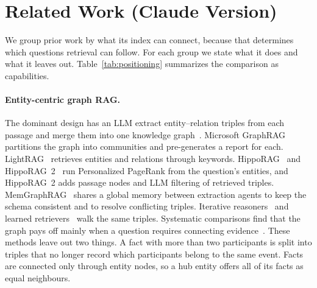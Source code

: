 \documentclass[sigconf, review, anonymous]{acmart}
\begin{document}
\section{Related Work (Claude Version)}
\label{sec:related_claude}

We group prior work by what its index can connect, because that determines which questions retrieval can follow. For each group we state what it does and what it leaves out. Table~\ref{tab:positioning} summarizes the comparison as capabilities.

\paragraph{Entity-centric graph RAG.}
The dominant design has an LLM extract entity--relation triples from each passage and merge them into one knowledge graph~\cite{bian2025llm,zhang2024extract,mo2025kggen,lairgi2024itext2kg}. Microsoft GraphRAG~\cite{edge2024local} partitions the graph into communities and pre-generates a report for each. LightRAG~\cite{guo2024lightrag} retrieves entities and relations through keywords. HippoRAG~\cite{gutierrez2024hipporag} and HippoRAG~2~\cite{gutierrez2025rag} run Personalized PageRank from the question's entities, and HippoRAG~2 adds passage nodes and LLM filtering of retrieved triples. MemGraphRAG~\cite{wu2026memgraphrag} shares a global memory between extraction agents to keep the schema consistent and to resolve conflicting triples. Iterative reasoners~\cite{sun2023think,ma2024think,luo2023reasoning} and learned retrievers~\cite{mavromatis2024gnn} walk the same triples. Systematic comparisons find that the graph pays off mainly when a question requires connecting evidence~\cite{zhou2025indepth,xiang2025when}. These methods leave out two things. A fact with more than two participants is split into triples that no longer record which participants belong to the same event. Facts are connected only through entity nodes, so a hub entity offers all of its facts as equal neighbours.
\end{document}
